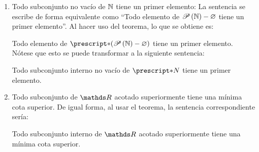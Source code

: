 \begin{enumerate}
  \item Todo subconjunto no vacío de $\mathbb{N}$ tiene un primer elemento:
        La sentencia se escribe de forma equivalente como
        ``Todo elemento de $\mathscr{P}\left(\mathbb{N}\right) - \varnothing$ tiene un primer
        elemento''. Al hacer uso del teorema, lo que se obtiene es:

        Todo elemento de $\st{(\Pts{\N}-\varnothing)}$ tiene un primer
        elemento. Nótese que esto se puede transformar a la siguiente
        sentencia:

        Todo subconjunto interno no vacío de $\st{N}$ tiene un primer
        elemento.
  \item Todo subconjunto de $\R$ acotado superiormente tiene una mínima
        cota superior. De igual forma, al usar el teorema, la sentencia
        correspondiente sería:

        Todo subconjunto interno de $\R$ acotado superiormente tiene
        una mínima cota superior.
\end{enumerate}
